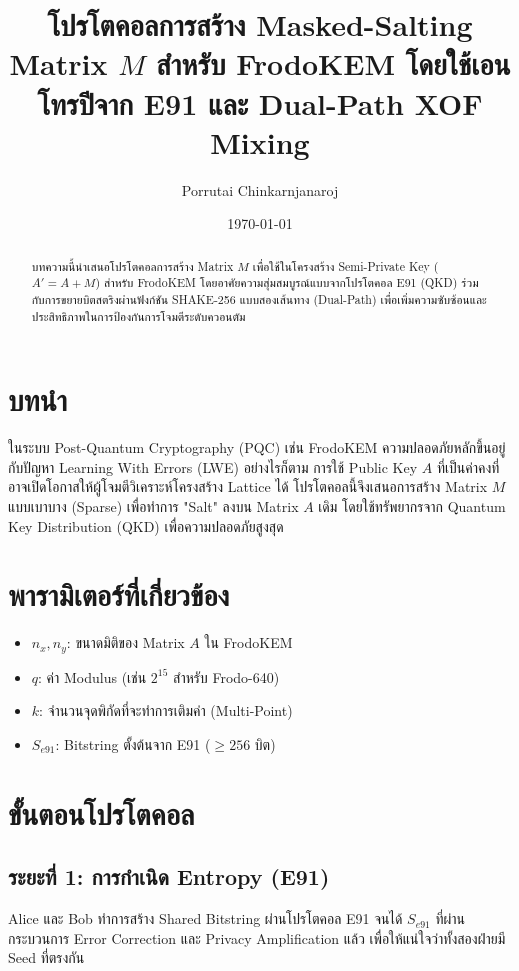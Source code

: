 \documentclass[twocolumn, a4paper]{article}
\title{\textbf{โปรโตคอลการสร้าง Masked-Salting Matrix $M$ สำหรับ FrodoKEM โดยใช้เอนโทรปีจาก E91 และ Dual-Path XOF Mixing}}
\author{Porrutai Chinkarnjanaroj}
\date{\today}
\begin{document}
	
	\maketitle
	
	\begin{abstract}
		บทความนี้นำเสนอโปรโตคอลการสร้าง Matrix $M$ เพื่อใช้ในโครงสร้าง Semi-Private Key ($A' = A + M$) สำหรับ FrodoKEM โดยอาศัยความสุ่มสมบูรณ์แบบจากโปรโตคอล E91 (QKD) ร่วมกับการขยายบิตสตริงผ่านฟังก์ชัน SHAKE-256 แบบสองเส้นทาง (Dual-Path) เพื่อเพิ่มความซับซ้อนและประสิทธิภาพในการป้องกันการโจมตีระดับควอนตัม
	\end{abstract}
	
	\section{บทนำ}
	ในระบบ Post-Quantum Cryptography (PQC) เช่น FrodoKEM ความปลอดภัยหลักขึ้นอยู่กับปัญหา Learning With Errors (LWE) อย่างไรก็ตาม การใช้ Public Key $A$ ที่เป็นค่าคงที่อาจเปิดโอกาสให้ผู้โจมตีวิเคราะห์โครงสร้าง Lattice ได้ โปรโตคอลนี้จึงเสนอการสร้าง Matrix $M$ แบบเบาบาง (Sparse) เพื่อทำการ "Salt" ลงบน Matrix $A$ เดิม โดยใช้ทรัพยากรจาก Quantum Key Distribution (QKD) เพื่อความปลอดภัยสูงสุด
	
	\section{พารามิเตอร์ที่เกี่ยวข้อง}
	\begin{itemize}
		\item $n_x, n_y$: ขนาดมิติของ Matrix $A$ ใน FrodoKEM
		\item $q$: ค่า Modulus (เช่น $2^{15}$ สำหรับ Frodo-640)
		\item $k$: จำนวนจุดพิกัดที่จะทำการเติมค่า (Multi-Point)
		\item $S_{e91}$: Bitstring ตั้งต้นจาก E91 ($\geq 256$ บิต)
	\end{itemize}
	
	\section{ขั้นตอนโปรโตคอล}
	
	\subsection{ระยะที่ 1: การกำเนิด Entropy (E91)}
	Alice และ Bob ทำการสร้าง Shared Bitstring ผ่านโปรโตคอล E91 จนได้ $S_{e91}$ ที่ผ่านกระบวนการ Error Correction และ Privacy Amplification แล้ว เพื่อให้แน่ใจว่าทั้งสองฝ่ายมี Seed ที่ตรงกัน
	
\end{document}
